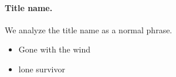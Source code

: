 \documentclass[11pt,a4paper]{article}
\begin{document}
\paragraph{Title name.}
We analyze the title name as a normal phrase.
\begin{itemize}
	\item Gone with the wind
	\item lone survivor
\end{itemize}

%
\end{document}
